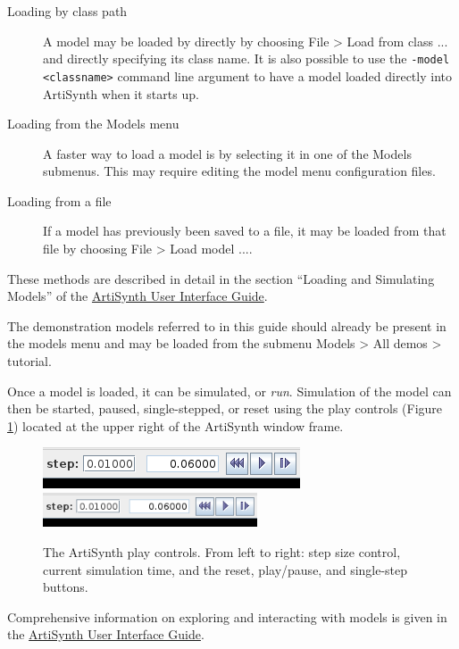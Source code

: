 \begin{description}

\item[Loading by class path]\mbox{}

A model may be loaded by directly by choosing {\sf File > Load from
class ...} and directly specifying its class name. It is also possible
to use the {\tt -model <classname>} command line argument to have a
model loaded directly into ArtiSynth when it starts up.

\item[Loading from the Models menu]\mbox{}

A faster way to load a model is by selecting it in one of the {\sf
Models} submenus. This may require editing the model menu
configuration files.

\item[Loading from a file]\mbox{}

If a model has previously been saved to a file, it may be loaded from
that file by choosing {\sf File > Load model ...}.

\end{description}

These methods are described in detail in the 
section ``Loading and Simulating Models'' of the
\href{../uiguide/uiguide.html}{
ArtiSynth User Interface Guide}.

\begin{sideblock}
The demonstration models referred to in this guide should already
be present in the models menu and may be loaded
from the submenu {\sf Models > All demos > tutorial}.
\end{sideblock}

Once a model is loaded, it can be simulated, or {\it run}.
Simulation
of the model can then be started, paused, single-stepped, or reset
using the play controls (Figure \ref{PlayControlsFig})
located at the upper right of the ArtiSynth window frame.

\begin{figure}[ht]
\begin{center}
\iflatexml
\includegraphics[]{../installation/images/playControls}
\else
\includegraphics[width=2.5in]{../installation/images/playControls}
\fi
\end{center}
\caption{The ArtiSynth play controls. From left to right: step size
control, current simulation time, and the reset, play/pause, and
single-step buttons.}%
\label{PlayControlsFig}
\end{figure}

Comprehensive information on exploring and interacting with models is
given in the
\href{../uiguide/uiguide.html}
{ArtiSynth User Interface Guide}.

